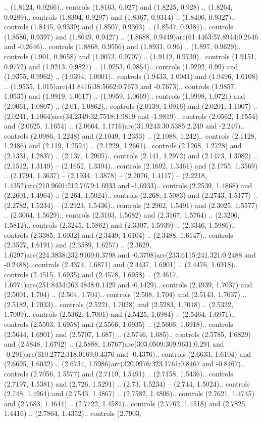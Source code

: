 .. (1.8124, 0.9266).. controls (1.8163, 0.927) and (1.8225, 0.928) .. (1.8264, 0.9289).. controls (1.8304, 0.9297) and (1.8367, 0.9314) .. (1.8406, 0.9327).. controls (1.8445, 0.9339) and (1.8507, 0.9363) .. (1.8547, 0.9381).. controls (1.8586, 0.9397) and (1.8649, 0.9427) .. (1.8688, 0.9449)arc(61.4463:57.8944:0.2646 and -0.2646).. controls (1.8868, 0.9556) and (1.8931, 0.96) .. (1.897, 0.9629).. controls (1.901, 0.9658) and (1.9073, 0.9707) .. (1.9112, 0.9739).. controls (1.9151, 0.9772) and (1.9213, 0.9827) .. (1.9253, 0.9864).. controls (1.9292, 0.99) and (1.9355, 0.9962) .. (1.9394, 1.0001).. controls (1.9433, 1.0041) and (1.9496, 1.0108) .. (1.9535, 1.015)arc(41.8416:38.5662:0.7673 and -0.7673).. controls (1.9857, 1.0535) and (1.9919, 1.0617) .. (1.9959, 1.0669).. controls (1.9998, 1.0721) and (2.0061, 1.0807) .. (2.01, 1.0862).. controls (2.0139, 1.0916) and (2.0201, 1.1007) .. (2.0241, 1.1064)arc(34.2349:32.7518:1.9819 and -1.9819).. controls (2.0562, 1.1554) and (2.0625, 1.1654) .. (2.0664, 1.1716)arc(31.9243:30.5385:2.249 and -2.249).. controls (2.0986, 1.2248) and (2.1049, 1.2353) .. (2.1088, 1.242).. controls (2.1128, 1.2486) and (2.119, 1.2594) .. (2.1229, 1.2661).. controls (2.1268, 1.2728) and (2.1331, 1.2837) .. (2.137, 1.2905).. controls (2.141, 1.2972) and (2.1473, 1.3082) .. (2.1512, 1.3149) -- (2.1652, 1.3394).. controls (2.1692, 1.3461) and (2.1755, 1.3569) .. (2.1794, 1.3637) -- (2.1934, 1.3878) -- (2.2076, 1.4117) -- (2.2218, 1.4352)arc(210.9601:212.7679:1.6933 and -1.6933).. controls (2.2539, 1.4868) and (2.2601, 1.4964) .. (2.264, 1.5024).. controls (2.268, 1.5083) and (2.2743, 1.5177) .. (2.2782, 1.5234) -- (2.2923, 1.5436).. controls (2.2962, 1.5491) and (2.3025, 1.5577) .. (2.3064, 1.5629).. controls (2.3103, 1.5682) and (2.3167, 1.5764) .. (2.3206, 1.5812).. controls (2.3245, 1.5862) and (2.3307, 1.5939) .. (2.3346, 1.5986).. controls (2.3385, 1.6032) and (2.3449, 1.6104) .. (2.3488, 1.6147).. controls (2.3527, 1.6191) and (2.3589, 1.6257) .. (2.3629, 1.6297)arc(224.3838:232.9109:0.3798 and -0.3798)arc(233.6115:241.321:0.2488 and -0.2488).. controls (2.4374, 1.6871) and (2.4437, 1.6901) .. (2.4476, 1.6918).. controls (2.4515, 1.6935) and (2.4578, 1.6958) .. (2.4617, 1.6971)arc(251.8434:263.4848:0.1429 and -0.1429).. controls (2.4939, 1.7037) and (2.5001, 1.704) .. (2.504, 1.704).. controls (2.508, 1.704) and (2.5143, 1.7037) .. (2.5182, 1.7033).. controls (2.5221, 1.7028) and (2.5283, 1.7018) .. (2.5322, 1.7009).. controls (2.5362, 1.7001) and (2.5425, 1.6984) .. (2.5464, 1.6971).. controls (2.5503, 1.6958) and (2.5566, 1.6935) .. (2.5606, 1.6918).. controls (2.5644, 1.6901) and (2.5707, 1.687) .. (2.5746, 1.685).. controls (2.5785, 1.6829) and (2.5848, 1.6792) .. (2.5888, 1.6767)arc(303.0509:309.9631:0.291 and -0.291)arc(310.2772:318.0169:0.4376 and -0.4376).. controls (2.6633, 1.6104) and (2.6695, 1.6032) .. (2.6734, 1.5986)arc(320.0976:323.1761:0.8467 and -0.8467).. controls (2.7056, 1.5577) and (2.7119, 1.5491) .. (2.7158, 1.5436).. controls (2.7197, 1.5381) and (2.726, 1.5291) .. (2.73, 1.5234) -- (2.744, 1.5024).. controls (2.748, 1.4964) and (2.7543, 1.4867) .. (2.7582, 1.4806).. controls (2.7621, 1.4745) and (2.7683, 1.4644) .. (2.7722, 1.4581).. controls (2.7762, 1.4518) and (2.7825, 1.4416) .. (2.7864, 1.4352).. controls (2.7903, 